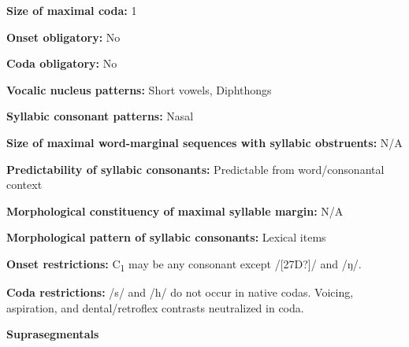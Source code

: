 \begin{styleBody}
\textbf{Size of maximal coda:} 1
\end{styleBody}

\begin{styleBody}
\textbf{Onset obligatory:} No
\end{styleBody}

\begin{styleBody}
\textbf{Coda obligatory:} No
\end{styleBody}

\begin{styleBody}
\textbf{Vocalic nucleus patterns:} Short vowels, Diphthongs
\end{styleBody}

\begin{styleBody}
\textbf{Syllabic consonant patterns:} Nasal
\end{styleBody}

\begin{styleBody}
\textbf{Size of maximal word{}-marginal sequences with syllabic obstruents:} N/A
\end{styleBody}

\begin{styleBody}
\textbf{Predictability of syllabic consonants:} Predictable from word/consonantal context
\end{styleBody}

\begin{styleBody}
\textbf{Morphological constituency of maximal syllable margin:} N/A
\end{styleBody}

\begin{styleBody}
\textbf{Morphological pattern of syllabic consonants:} Lexical items
\end{styleBody}

\begin{styleBody}
\textbf{Onset restrictions: }C\textsubscript{1} may be any consonant except /[27D?]/ and /ŋ/.
\end{styleBody}

\begin{styleBody}
\textbf{Coda restrictions: }/s/ and /h/ do not occur in native codas. Voicing, aspiration, and dental/retroflex contrasts neutralized in coda.
\end{styleBody}

\begin{styleBody}
\textbf{Suprasegmentals}
\end{styleBody}

